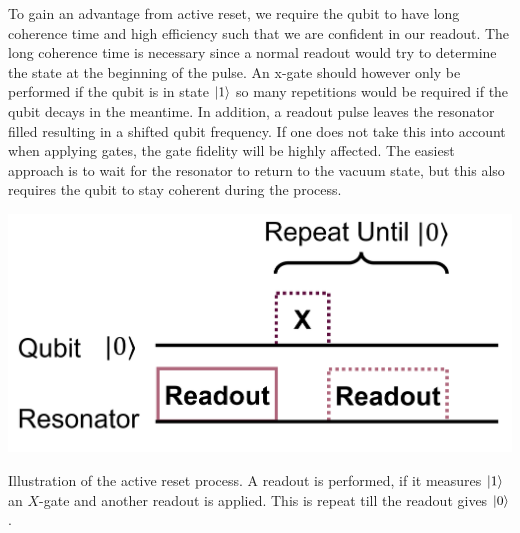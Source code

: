 To gain an advantage from active reset, we require the qubit to have long coherence time and high efficiency such that we are confident in our readout. The long coherence time is necessary since a normal readout would try to determine the state at the beginning of the pulse. An x-gate should however only be performed if the qubit is in state $\ket{1}$ so many repetitions would be required if the qubit decays in the meantime. In addition, a readout pulse leaves the resonator filled resulting in a shifted qubit frequency. If one does not take this into account when applying gates, the gate fidelity will be highly affected. The easiest approach is to wait for the resonator to return to the vacuum state, but this also requires the qubit to stay coherent during the process.  
\begin{marginfigure}[- 5 cm]
    \centering
    \includegraphics[]{Figs/circuits/active_reset.png}
    \caption{Illustration of the active reset process. A readout is performed, if it measures $\ket{1}$ an $X$-gate and another readout is applied. This is repeat till the readout gives $\ket{0}$.}
    \label{fig:active_reset}
\end{marginfigure}

